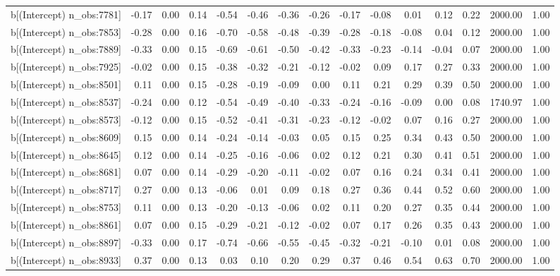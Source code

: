 \begin{table}[ht]
\begin{tabular}{rrrrrrrrrrrrrrr}
  b[(Intercept) n\_obs:7781] & -0.17 & 0.00 & 0.14 & -0.54 & -0.46 & -0.36 & -0.26 & -0.17 & -0.08 & 0.01 & 0.12 & 0.22 & 2000.00 & 1.00 \\ 
  b[(Intercept) n\_obs:7853] & -0.28 & 0.00 & 0.16 & -0.70 & -0.58 & -0.48 & -0.39 & -0.28 & -0.18 & -0.08 & 0.04 & 0.12 & 2000.00 & 1.00 \\ 
  b[(Intercept) n\_obs:7889] & -0.33 & 0.00 & 0.15 & -0.69 & -0.61 & -0.50 & -0.42 & -0.33 & -0.23 & -0.14 & -0.04 & 0.07 & 2000.00 & 1.00 \\ 
  b[(Intercept) n\_obs:7925] & -0.02 & 0.00 & 0.15 & -0.38 & -0.32 & -0.21 & -0.12 & -0.02 & 0.09 & 0.17 & 0.27 & 0.33 & 2000.00 & 1.00 \\ 
  b[(Intercept) n\_obs:8501] & 0.11 & 0.00 & 0.15 & -0.28 & -0.19 & -0.09 & 0.00 & 0.11 & 0.21 & 0.29 & 0.39 & 0.50 & 2000.00 & 1.00 \\ 
  b[(Intercept) n\_obs:8537] & -0.24 & 0.00 & 0.12 & -0.54 & -0.49 & -0.40 & -0.33 & -0.24 & -0.16 & -0.09 & 0.00 & 0.08 & 1740.97 & 1.00 \\ 
  b[(Intercept) n\_obs:8573] & -0.12 & 0.00 & 0.15 & -0.52 & -0.41 & -0.31 & -0.23 & -0.12 & -0.02 & 0.07 & 0.16 & 0.27 & 2000.00 & 1.00 \\ 
  b[(Intercept) n\_obs:8609] & 0.15 & 0.00 & 0.14 & -0.24 & -0.14 & -0.03 & 0.05 & 0.15 & 0.25 & 0.34 & 0.43 & 0.50 & 2000.00 & 1.00 \\ 
  b[(Intercept) n\_obs:8645] & 0.12 & 0.00 & 0.14 & -0.25 & -0.16 & -0.06 & 0.02 & 0.12 & 0.21 & 0.30 & 0.41 & 0.51 & 2000.00 & 1.00 \\ 
  b[(Intercept) n\_obs:8681] & 0.07 & 0.00 & 0.14 & -0.29 & -0.20 & -0.11 & -0.02 & 0.07 & 0.16 & 0.24 & 0.34 & 0.41 & 2000.00 & 1.00 \\ 
  b[(Intercept) n\_obs:8717] & 0.27 & 0.00 & 0.13 & -0.06 & 0.01 & 0.09 & 0.18 & 0.27 & 0.36 & 0.44 & 0.52 & 0.60 & 2000.00 & 1.00 \\ 
  b[(Intercept) n\_obs:8753] & 0.11 & 0.00 & 0.13 & -0.20 & -0.13 & -0.06 & 0.02 & 0.11 & 0.20 & 0.27 & 0.35 & 0.44 & 2000.00 & 1.00 \\ 
  b[(Intercept) n\_obs:8861] & 0.07 & 0.00 & 0.15 & -0.29 & -0.21 & -0.12 & -0.02 & 0.07 & 0.17 & 0.26 & 0.35 & 0.43 & 2000.00 & 1.00 \\ 
  b[(Intercept) n\_obs:8897] & -0.33 & 0.00 & 0.17 & -0.74 & -0.66 & -0.55 & -0.45 & -0.32 & -0.21 & -0.10 & 0.01 & 0.08 & 2000.00 & 1.00 \\ 
  b[(Intercept) n\_obs:8933] & 0.37 & 0.00 & 0.13 & 0.03 & 0.10 & 0.20 & 0.29 & 0.37 & 0.46 & 0.54 & 0.63 & 0.70 & 2000.00 & 1.00 \\ 

\end{tabular}
\end{table}
